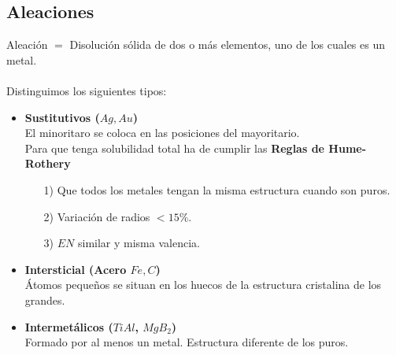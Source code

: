 \documentclass[12pt]{article}
\begin{document}
	\subsection{Aleaciones}
	Aleación $=$ Disolución sólida de dos o más elementos, uno de los cuales es un metal.\\
	\\
	Distinguimos los siguientes tipos:
	\begin{itemize}
		\item \textbf{Sustitutivos ($Ag, Au$)}\\
		El minoritaro se coloca en las posiciones del mayoritario.\\
		Para que tenga solubilidad total ha de cumplir las \textbf{Reglas de Hume-Rothery}
		\begin{itemize}
			\item[1)] Que todos los metales tengan la misma estructura cuando son puros.
			\item[2)] Variación de radios $< 15\%$.
			\item[3)] $EN$ similar y misma valencia.
		\end{itemize}
		\item \textbf{Intersticial (Acero $Fe,C$)}\\
		Átomos pequeños se situan en los huecos de la estructura cristalina de los grandes.
		\item \textbf{Intermetálicos ($TiAl$, $MgB_2$)} \\
		Formado por al menos un metal. Estructura diferente de los puros.		
	\end{itemize}
	
\end{document}
